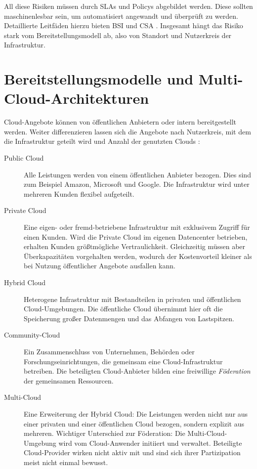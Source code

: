 All diese Risiken müssen durch SLAs und Policys abgebildet werden. Diese sollten maschinenlesbar sein, um automatisiert angewandt und überprüft zu werden. Detaillierte Leitfäden hierzu bieten BSI und CSA \cite{bsi:2014:Sicherheitsrichtlinie, csa:2015:star}. Insgesamt hängt das Risiko stark vom Bereitstellungsmodell ab, also von Standort und Nutzerkreis der Infrastruktur.


\section{Bereitstellungsmodelle und Multi-Cloud-Architekturen}

Cloud-Angebote können von öffentlichen Anbietern oder intern bereitgestellt werden. Weiter differenzieren lassen sich die Angebote nach Nutzerkreis, mit dem die Infrastruktur geteilt wird und Anzahl der genutzten Clouds \cite{petcu:2014:cloud-taxonomy, grozev:2014:cloud-taxonomy}:

\begin{description}
	
	\item[Public Cloud] Alle Leistungen werden von einem öffentlichen Anbieter bezogen. Dies sind zum Beispiel Amazon, Microsoft und Google. Die Infrastruktur wird unter mehreren Kunden flexibel aufgeteilt.
	
	\item[Private Cloud] Eine eigen- oder fremd-betriebene Infrastruktur mit exklusivem Zugriff für einen Kunden. Wird die Private Cloud im eigenen Datencenter betrieben, erhalten Kunden größtmögliche Vertraulichkeit. Gleichzeitig müssen aber Überkapazitäten vorgehalten werden, wodurch der Kostenvorteil kleiner als bei Nutzung öffentlicher Angebote ausfallen kann.
	
	\item[Hybrid Cloud] Heterogene Infrastruktur mit Bestandteilen in privaten und öffentlichen Cloud-Umgebungen. Die öffentliche Cloud übernimmt hier oft die Speicherung großer Datenmengen und das Abfangen von Lastspitzen.
	
	\item[Community-Cloud] Ein Zusammenschluss von Unternehmen, Behörden oder For\-sch\-ungs\-ein\-rich\-tun\-gen, die gemeinsam eine Cloud-Infrastruktur betreiben. Die beteiligten Cloud-Anbieter bilden eine freiwillige \emph{Föderation} der gemeinsamen Ressourcen.
	
	\item[Multi-Cloud] Eine Erweiterung der Hybrid Cloud: Die Leistungen werden nicht nur aus einer privaten und einer öffentlichen Cloud bezogen, sondern explizit aus mehreren. Wichtiger Unterschied zur Föderation: Die Multi-Cloud-Umgebung wird vom Cloud-Anwender initiiert und verwaltet. Beteiligte Cloud-Provider wirken nicht aktiv mit und sind sich ihrer Partizipation meist nicht einmal bewusst.
	
\end{description}

